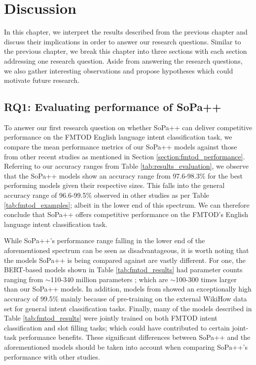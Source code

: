 \chapter{Discussion}

\label{chapter:discussion}

In this chapter, we interpret the results described from the previous chapter
and discuss their implications in order to answer our research questions.
Similar to the previous chapter, we break this chapter into three sections with
each section addressing one research question. Aside from answering the research
questions, we also gather interesting observations and propose hypotheses which could
motivate future research.

\section{RQ1: Evaluating performance of SoPa++}

To answer our first research question on whether SoPa++ can deliver competitive
performance on the FMTOD English language intent classification task, we compare
the mean performance metrics of our SoPa++ models against those from other
recent studies as mentioned in Section \ref{section:fmtod_performance}.
Referring to our accuracy ranges from Table \ref{tab:results_evaluation}, we
observe that the SoPa++ models show an accuracy range from 97.6-98.3$\%$ for the
best performing models given their respective sizes. This falls into the general
accuracy range of 96.6-99.5$\%$ observed in other studies as per Table
\ref{tab:fmtod_examples}; albeit in the lower end of this spectrum. We can
therefore conclude that SoPa++ offers competitive performance on the FMTOD's
English language intent classification task.

While SoPa++'s performance range falling in the lower end of the aforementioned
spectrum can be seen as disadvantageous, it is worth noting that the models
SoPa++ is being compared against are vastly different. For one, the BERT-based
models shown in Table \ref{tab:fmtod_results} had parameter counts ranging from
$\sim$110-340 million parameters \citep{devlin-etal-2019-bert}; which are
$\sim$100-300 times larger than our SoPa++ models. In addition, models from
\citet{zhang-etal-2020-intent} showed an exceptionally high accuracy of 99.5$\%$
mainly because of pre-training on the external WikiHow data set for general
intent classification tasks. Finally, many of the models described in Table
\ref{tab:fmtod_results} were jointly trained on both FMTOD intent classification
and slot filling tasks; which could have contributed to certain joint-task
performance benefits. These significant differences between SoPa++ and the
aforementioned models should be taken into account when comparing SoPa++'s
performance with other studies. 

